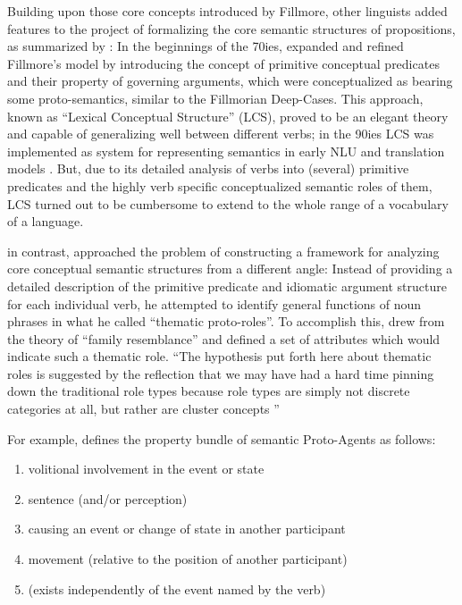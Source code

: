 Building upon those core concepts introduced by Fillmore, other linguists added
features to the project of formalizing the core semantic structures of propositions,
as summarized by \citeauthor{palmer2010semantic}: In the beginnings of the 70ies,
\cite{jackendoff1972semantic} expanded and refined Fillmore's model by introducing the
concept of primitive conceptual predicates and their property of governing arguments,
which were conceptualized as bearing some proto-semantics, similar to the Fillmorian
Deep-Cases. This approach, known as ``Lexical Conceptual Structure'' (LCS), proved
to be an elegant theory and capable of generalizing well between different verbs; in
the 90ies LCS was implemented as system for representing semantics in early NLU and
translation models \citep{palmer2010semantic}. But, due to its detailed analysis of
verbs into (several) primitive predicates and the highly verb specific conceptualized
semantic roles of them, LCS turned out to be cumbersome to extend to the whole range
of a vocabulary of a language.

\cite{dowty1991thematic} in contrast, approached the problem of constructing a framework for
analyzing core conceptual semantic structures from a different angle: Instead of providing
a detailed description of the primitive predicate and idiomatic argument structure for each
individual verb, he attempted to identify general functions of noun phrases in what he called
``thematic proto-roles''. To accomplish this, \citeauthor{dowty1991thematic} drew from the
theory of ``family resemblance'' and defined a set of attributes which would indicate such
a thematic role. ``The hypothesis put forth here about thematic roles is suggested by the
reflection that we may have had a hard time pinning down the traditional role types because
role types are simply not discrete categories at all, but rather are cluster concepts
\textelp{}'' \citep[p.~571]{dowty1991thematic}

For example, \citep[p.~572]{dowty1991thematic} defines the property bundle of semantic Proto-Agents
as follows:

\begin{enumerate}[label=\alph*]
  \item volitional involvement in the event or state
  \item sentence (and/or perception)
  \item causing an event or change of state in another participant
  \item movement (relative to the position of another participant)
  \item (exists independently of the event named by the verb)
\end{enumerate}

